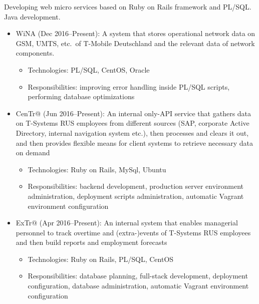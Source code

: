\documentclass{cv}
\begin{document}
\begin{cvblock}{%
  }

  Developing web micro services based on Ruby on Rails framework and PL/SQL\@.
  Java development.

  \begin{itemize}
    \item WiNA (Dec 2016--Present):
      A system that stores operational network data on GSM,
      UMTS, etc.\ of T-Mobile Deutschland and the relevant data of
      network components.
      \begin{itemize}
        \item Technologies: PL/SQL, CentOS, Oracle
        \item Responsibilities: improving error handling inside PL/SQL
          scripts, performing database optimizations
      \end{itemize}

    \item CenTr@ (Jun 2016--Present):
      An internal only-API service that gathers data on T-Systems RUS employees
      from different sources (SAP, corporate Active Directory,
      internal navigation system etc.), then processes and clears it out, and
      then provides flexible means for client systems to retrieve necessary
      data on demand
      \begin{itemize}
        \item Technologies: Ruby on Rails, MySql, Ubuntu
        \item Responsibilities: backend development, production server
          environment administration, deployment scripts administration,
          automatic Vagrant environment configuration
      \end{itemize}

    \item ExTr@ (Apr 2016--Present):
      An internal system that enables managerial personnel to track overtime
      and (extra-)events of T-Systems RUS employees and then build reports and
      employment forecasts
      \begin{itemize}
        \item Technologies: Ruby on Rails, PL/SQL, CentOS
        \item Responsibilities: database planning, full-stack development,
          deployment configuration, database administration, automatic Vagrant
          environment configuration
      \end{itemize}


\end{itemize}
\end{cvblock}
\end{document}
